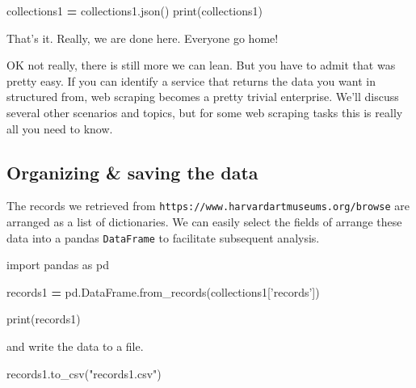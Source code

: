 \documentclass[]{book}
\newenvironment{Shaded}{\begin{snugshade}}{\end{snugshade}}
\newcommand{\BuiltInTok}[1]{#1}
\newcommand{\ImportTok}[1]{#1}
\newcommand{\NormalTok}[1]{#1}
\newcommand{\OperatorTok}[1]{\textcolor[rgb]{0.81,0.36,0.00}{\textbf{#1}}}
\newcommand{\StringTok}[1]{\textcolor[rgb]{0.31,0.60,0.02}{#1}}
\begin{document}
\begin{Shaded}
\begin{Highlighting}[]
\NormalTok{collections1 }\OperatorTok{=}\NormalTok{ collections1.json()}
\BuiltInTok{print}\NormalTok{(collections1)}
\end{Highlighting}
\end{Shaded}

That's it. Really, we are done here. Everyone go home!

OK not really, there is still more we can lean. But you have to admit
that was pretty easy. If you can identify a service that returns the
data you want in structured from, web scraping becomes a pretty
trivial enterprise. We'll discuss several other scenarios and topics,
but for some web scraping tasks this is really all you need to know.

\hypertarget{organizing-saving-the-data}{%
\subsection{Organizing \& saving the data}\label{organizing-saving-the-data}}

The records we retrieved from
\texttt{https://www.harvardartmuseums.org/browse} are arranged as a list of
dictionaries. We can easily select the fields of arrange these data
into a pandas \texttt{DataFrame} to facilitate subsequent analysis.

\begin{Shaded}
\begin{Highlighting}[]
\ImportTok{import}\NormalTok{ pandas }\ImportTok{as}\NormalTok{ pd}
\end{Highlighting}
\end{Shaded}

\begin{Shaded}
\begin{Highlighting}[]
\NormalTok{records1 }\OperatorTok{=}\NormalTok{ pd.DataFrame.from_records(collections1[}\StringTok{'records'}\NormalTok{])}
\end{Highlighting}
\end{Shaded}

\begin{Shaded}
\begin{Highlighting}[]
\BuiltInTok{print}\NormalTok{(records1)}
\end{Highlighting}
\end{Shaded}

and write the data to a file.

\begin{Shaded}
\begin{Highlighting}[]
\NormalTok{records1.to_csv(}\StringTok{"records1.csv"}\NormalTok{)}
\end{Highlighting}
\end{Shaded}
\end{document}
